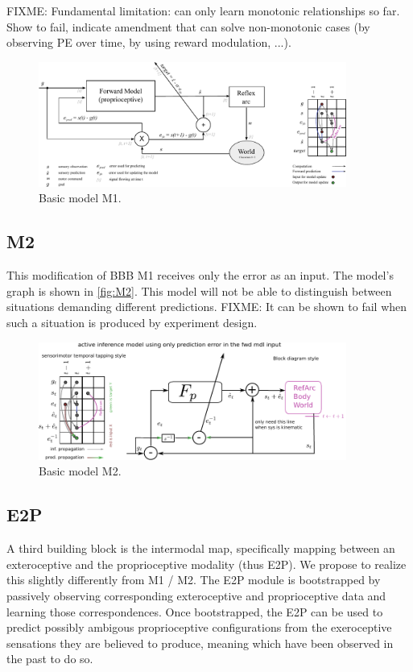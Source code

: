 \documentclass[11pt]{llncs}
\begin{document}
FIXME: Fundamental limitation: can only learn monotonic relationships so
far. Show to fail, indicate amendment that can solve non-monotonic
cases (by observing PE over time, by using reward modulation, ...).

\begin{figure}
  \centering
  \includegraphics[width=0.9\textwidth]{img/mdl_prediction_error_and_goal.pdf}
  \caption{\label{fig:M1} Basic model M1.}
\end{figure}

\subsection{M2}

This modification of BBB M1 receives only the error as an input. The
model's graph is shown in \autoref{fig:M2}. This model will not be
able to distinguish between situations demanding different
predictions. FIXME: It can be shown to fail when such a situation is produced
by experiment design.

\begin{figure}
  \centering
  \includegraphics[width=0.9\textwidth]{img/mdl_prediction_error_only.pdf}
  \caption{\label{fig:M2} Basic model M2.}
\end{figure}

\subsection{E2P}

A third building block is the intermodal map, specifically mapping
between an exteroceptive and the proprioceptive modality (thus
E2P). We propose to realize this slightly differently from M1 /
M2. The E2P module is bootstrapped by passively observing
corresponding exteroceptive and proprioceptive data and learning those
correspondences. Once bootstrapped, the E2P can be used to predict
possibly ambigous proprioceptive configurations from the exeroceptive
sensations they are believed to produce, meaning which have been
observed in the past to do so.
\end{document}
